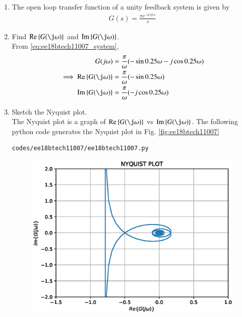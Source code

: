 \begin{enumerate}[label=\thesection.\arabic*.,ref=\thesection.\theenumi]
\item The open loop transfer function of a unity feedback system is given by
\begin{align}
\label{eq:ee18btech11007_system}
 G(s)=\frac{\pi e^{-0.25s}}{s}
\end{align}
\item Find $\text{Re} \cbrak{G(\j \omega)}$ and $\text{Im} \cbrak{G(\j \omega)}$.
\\
\solution From \eqref{eq:ee18btech11007_system},
%
\begin{align}
G(j\omega)&=\frac{\pi}{\omega}(-\sin{0.25\omega}-j\cos{0.25\omega})
\\
\implies  \text{Re} \cbrak{G(\j \omega)}&=\frac{\pi}{\omega}(-\sin{0.25\omega}) 
\\
 \text{Im} \cbrak{G(\j \omega)}&=\frac{\pi}{\omega}(-j\cos{0.25\omega}) 
\end{align}
%
\item Sketch the Nyquist plot.
\\
\solution The Nyquist plot is a graph of $\text{Re} \cbrak{G(\j \omega)}$  vs $\text{Im} \cbrak{G(\j \omega)}$.
The following python code generates the Nyquist plot in Fig.  \ref{fig:ee18btech11007}
\begin{lstlisting}
codes/ee18btech11007/ee18btech11007.py
\end{lstlisting}
%
\begin{figure}[!h]
  \includegraphics[width=\columnwidth]{./figs/ee18btech11007.eps}

\end{figure}
\end{enumerate}
